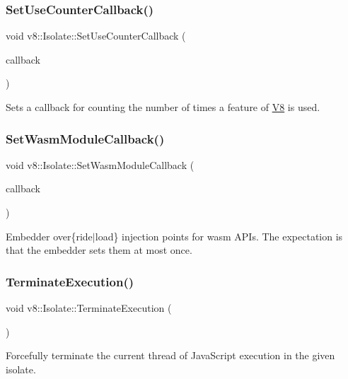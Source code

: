 \subsubsection{\texorpdfstring{Set\+Use\+Counter\+Callback()}{SetUseCounterCallback()}}
{\footnotesize\ttfamily void v8\+::\+Isolate\+::\+Set\+Use\+Counter\+Callback (\begin{DoxyParamCaption}\item[{Use\+Counter\+Callback}]{callback }\end{DoxyParamCaption})}

Sets a callback for counting the number of times a feature of \mbox{\hyperlink{classv8_1_1V8}{V8}} is used. \mbox{\label{classv8_1_1Isolate_ad3dd2d7c8d03b3243f513c5f4d34723f}} 
\subsubsection{\texorpdfstring{Set\+Wasm\+Module\+Callback()}{SetWasmModuleCallback()}}
{\footnotesize\ttfamily void v8\+::\+Isolate\+::\+Set\+Wasm\+Module\+Callback (\begin{DoxyParamCaption}\item[{Extension\+Callback}]{callback }\end{DoxyParamCaption})}

Embedder over\{ride$\vert$load\} injection points for wasm A\+P\+Is. The expectation is that the embedder sets them at most once. \mbox{\label{classv8_1_1Isolate_ad212b2e0b66ff5d586cd79cfa0b555fb}} 
\subsubsection{\texorpdfstring{Terminate\+Execution()}{TerminateExecution()}}
{\footnotesize\ttfamily void v8\+::\+Isolate\+::\+Terminate\+Execution (\begin{DoxyParamCaption}{ }\end{DoxyParamCaption})}

Forcefully terminate the current thread of Java\+Script execution in the given isolate.

